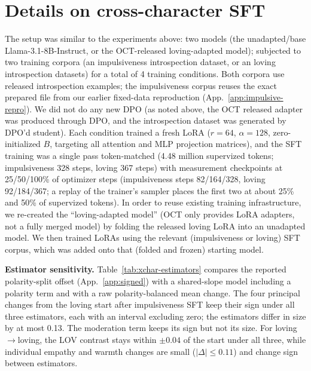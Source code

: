 \documentclass{article}
\begin{document}
\section{Details on cross-character SFT}
\label{app:xchar}
The setup was similar to the experiments above: two models (the unadapted/base Llama-3.1-8B-Instruct, or the OCT-released loving-adapted model); subjected to two training corpora (an impulsiveness introspection dataset, or an loving introspection datasets) for a total of 4 training conditions. Both corpora use released introspection examples; the impulsiveness corpus reuses the exact prepared file from our earlier fixed-data reproduction (App.~\ref{app:impulsive-repro}). We did not do any new DPO (as noted above, the OCT released adapter was produced through DPO, and the introspection dataset was generated by DPO'd student). Each condition trained a fresh LoRA (\(r=64\), \(\alpha=128\), zero-initialized \(B\), targeting all attention and MLP projection matrices), and the SFT training was a single pass token-matched (4.48 million supervized tokens; impulsiveness 328 steps, loving 367 steps) with measurement checkpoints at 25/50/100\% of optimizer steps (impulsiveness steps 82/164/328, loving 92/184/367; a replay of the trainer's sampler places the first two at about 25\% and 50\% of supervized tokens). In order to reuse existing training infrastructure, we re-created the ``loving-adapted model'' (OCT only provides LoRA adapters, not a fully merged model) by folding the released loving LoRA into an unadapted model. We then trained LoRAs using the relevant (impulsiveness or loving) SFT corpus, which was added onto that (folded and frozen) starting model.

\textbf{Estimator sensitivity.} Table~\ref{tab:xchar-estimators} compares the reported polarity-split offset (App.~\ref{app:signed}) with a shared-slope model including a polarity term and with a raw polarity-balanced mean change. The four principal changes from the loving start after impulsiveness SFT keep their sign under all three estimators, each with an interval excluding zero; the estimators differ in size by at most 0.13. The moderation term keeps its sign but not its size. For loving$\rightarrow$loving, the LOV contrast stays within $\pm0.04$ of the start under all three, while individual empathy and warmth changes are small ($|\Delta|\le0.11$) and change sign between estimators.
\end{document}
